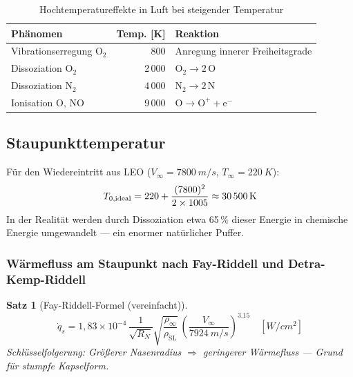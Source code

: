 ﻿\documentclass[12pt,a4paper]{article}
\newtheorem{satz}{Satz}[section]
\begin{document}
\begin{table}[H]
\centering
\caption{Hochtemperatureffekte in Luft bei steigender Temperatur}
\label{tab:hochtemp}
\begin{tabular}{lrl}
\toprule
\textbf{Phänomen} & \textbf{Temp. [K]} & \textbf{Reaktion}\\
\midrule
Vibrationserregung O$_2$        & 800    & Anregung innerer Freiheitsgrade\\
Dissoziation O$_2$              & 2\,000 & $\mathrm{O_2 \to 2\,O}$\\
Dissoziation N$_2$              & 4\,000 & $\mathrm{N_2 \to 2\,N}$\\
Ionisation O, NO                & 9\,000 & $\mathrm{O \to O^+ + e^-}$\\
\bottomrule
\end{tabular}
\end{table}

\subsection{Staupunkttemperatur}

Für den Wiedereintritt aus LEO ($V_\infty = \SI{7800}{m/s}$, $T_\infty = \SI{220}{K}$):
\[
  T_{0,\text{ideal}} = 220 + \frac{(7800)^2}{2\times1005}
    \approx \SI{30\,500}{K}
\]
In der Realität werden durch Dissoziation etwa 65\,\% dieser Energie in chemische
Energie umgewandelt --- ein enormer natürlicher Puffer.

\subsubsection{Wärmefluss am Staupunkt nach Fay-Riddell und Detra-Kemp-Riddell}

\begin{satz}[Fay-Riddell-Formel (vereinfacht)]
\[
  \dot{q}_s = 1{,}83\times10^{-4}\,\frac{1}{\sqrt{R_N}}
    \sqrt{\frac{\rho_\infty}{\rho_{\mathrm{SL}}}}\,
    \left(\frac{V_\infty}{\SI{7924}{m/s}}\right)^{3.15}
    \quad [\si{W/cm^2}]
\]
Schlüsselfolgerung: Größerer Nasenradius $\Rightarrow$ geringerer Wärmefluss ---
Grund für stumpfe Kapselform.
\end{satz}
\end{document}
